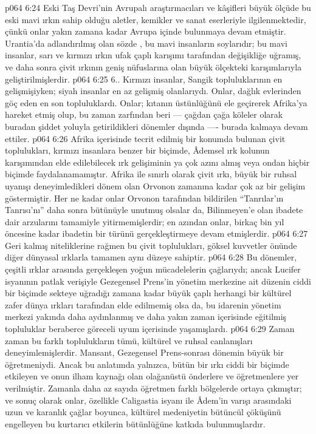\vs p064 6:24 Eski Taş Devri’nin Avrupalı araştırmacıları ve kâşifleri büyük ölçüde bu eski mavi ırkın sahip olduğu aletler, kemikler ve sanat eserleriyle ilgilenmektedir, çünkü onlar yakın zamana kadar Avrupa içinde bulunmaya devam etmiştir. Urantia’da adlandırılmış olan sözde , bu mavi insanların soylarıdır; bu mavi insanlar, sarı ve kırmızı ırkın ufak çaplı karışımı tarafından değişikliğe uğramış, ve daha sonra çivit ırkının geniş nüfuslarına olan büyük ölçekteki karışımlarıyla geliştirilmişlerdir.
\vs p064 6:25 6.\bibnobreakspace {}. Kırmızı insanlar, Sangik topluluklarının en gelişmişiyken; siyah insanlar en az gelişmiş olanlarıydı. Onlar, dağlık evlerinden göç eden en son topluluklardı. Onlar; kıtanın üstünlüğünü ele geçirerek Afrika’ya hareket etmiş olup, bu zaman zarfından beri --- çağdan çağa köleler olarak buradan şiddet yoluyla getirildikleri dönemler dışında ---\hyp{} burada kalmaya devam ettiler.
\vs p064 6:26 Afrika içerisinde tecrit edilmiş bir konumda bulunan çivit toplulukları, kırmızı insanlara benzer bir biçimde, Âdemsel ırk kolunun karışımından elde edilebilecek ırk gelişiminin ya çok azını almış veya ondan hiçbir biçimde faydalanamamıştır. Afrika ile sınırlı olarak çivit ırkı, büyük bir ruhsal uyanışı deneyimledikleri dönem olan Orvonon zamanına kadar çok az bir gelişim göstermiştir. Her ne kadar onlar Orvonon tarafından bildirilen “Tanrılar’ın Tanrısı’nı” daha sonra bütünüyle unutmuş olsalar da, Bilinmeyen’e olan ibadete dair arzularını tamamiyle yitirmemişlerdir; en azından onlar, birkaç bin yıl öncesine kadar ibadetin bir türünü gerçekleştirmeye devam etmişlerdir.
\vs p064 6:27 Geri kalmış niteliklerine rağmen bu çivit toplulukları, göksel kuvvetler önünde diğer dünyasal ırklarla tamamen aynı düzeye sahiptir.
\vs p064 6:28 Bu dönemler, çeşitli ırklar arasında gerçekleşen yoğun mücadelelerin çağlarıydı; ancak Lucifer isyanının patlak verişiyle Gezegensel Prens’in yönetim merkezine ait düzenin ciddi bir biçimde sekteye uğradığı zamana kadar büyük çaplı herhangi bir kültürel zafer dünya ırkları tarafından elde edilmemiş olsa da, bu idarenin yönetim merkezi yakında daha aydınlanmış ve daha yakın zaman içerisinde eğitilmiş topluluklar beraberce göreceli uyum içerisinde yaşamışlardı.
\vs p064 6:29 Zaman zaman bu farklı toplulukların tümü, kültürel ve ruhsal canlanışları deneyimlemişlerdir. Mansant, Gezegensel Prens\hyp{}sonrası dönemin büyük bir öğretmeniydi. Ancak bu anlatımda yalnızca, bütün bir ırkı ciddi bir biçimde etkileyen ve onun ilham kaynağı olan olağanüstü önderlere ve öğretmenlere yer verilmiştir. Zamanla daha az sayıda öğretmen farklı bölgelerde ortaya çıkmıştır; ve sonuç olarak onlar, özellikle Caligastia isyanı ile Âdem’in varışı arasındaki uzun ve karanlık çağlar boyunca, kültürel medeniyetin bütüncül çöküşünü engelleyen bu kurtarıcı etkilerin bütünlüğüne katkıda bulunmuşlardır.
